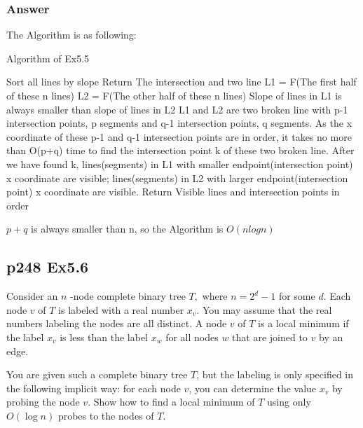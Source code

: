 \documentclass[a4paper]{article}
\begin{document}
\subsubsection*{Answer}
The Algorithm is as following:
\begin{algorithm}[!htb]
	\caption{Algorithm of Ex5.5}
	\begin{algorithmic}[1]
		\State Sort all lines by slope
		\State Return{ The intersection and two line}
		\Else
		\State L1 = F(The first half of these n lines)
		\State L2 = F(The other half of these n lines)
		\State Slope of lines in L1 is always smaller than slope of lines in L2
		\State L1 and L2 are two broken line with p-1 intersection points, p segments and q-1 intersection points, q segments. As the x coordinate of these p-1 and q-1 intersection points are in order, it takes no more than O(p+q) time to find the intersection point k of these two broken line.
		\State After we have found k, lines(segments) in L1 with smaller endpoint(intersection point) x coordinate are visible;  lines(segments) in L2 with larger endpoint(intersection point) x coordinate are visible.
		\State Return{ Visible lines and intersection points in order}
		\EndIf
		\EndFunction
	\end{algorithmic}
\end{algorithm}
\par $p+q$ is always smaller than n, so the Algorithm is $O(nlogn)$
\vspace{2cm}

\subsection*{p248 Ex5.6}
\begin{adjustwidth}{1cm}{1cm}
	Consider an $n$ -node complete binary tree $T,$ where $n=2^{d}-1$ for some $d$. Each node $v$ of $T$ is labeled with a real number $x_{v}$. You may assume that the real numbers labeling the nodes are all distinct. A node $v$ of $T$ is a local minimum if the label $x_{v}$ is less than the label $x_{w}$ for all nodes $w$ that are joined to $v$ by an edge.

	You are given such a complete binary tree $T$, but the labeling is only specified in the following implicit way: for each node $v$, you can determine the value $x_{v}$ by probing the node $v .$ Show how to find a local minimum of $T$ using only $O(\log n)$ probes to the nodes of $T$.
\end{adjustwidth}
\end{document}
